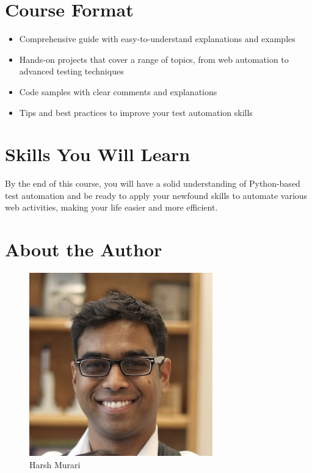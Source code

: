 \documentclass[
  paper=a4,
  ,captions=tableheading
]{scrartcl}
\providecommand{\tightlist}{%
  \setlength{\itemsep}{0pt}\setlength{\parskip}{0pt}}
\begin{document}
\hypertarget{course-format}{%
\section{Course Format}\label{course-format}}

\begin{itemize}
\tightlist
\item
  Comprehensive guide with easy-to-understand explanations and examples
\item
  Hands-on projects that cover a range of topics, from web automation to
  advanced testing techniques
\item
  Code samples with clear comments and explanations
\item
  Tips and best practices to improve your test automation skills
\end{itemize}

\hypertarget{skills-you-will-learn}{%
\section{Skills You Will Learn}\label{skills-you-will-learn}}

By the end of this course, you will have a solid understanding of
Python-based test automation and be ready to apply your newfound skills
to automate various web activities, making your life easier and more
efficient.

\hypertarget{about-the-author}{%
\section{About the Author}\label{about-the-author}}

\begin{figure}
\centering
\includegraphics{img/harsh-murari.jpg}
\caption{Harsh Murari}
\end{figure}
\end{document}
